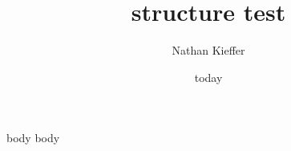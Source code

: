 \documentclass{report}
\title{structure test}
\author{Nathan Kieffer}
\date{today}
\begin{document}
\maketitle
{body}
{body}
\end{document}
